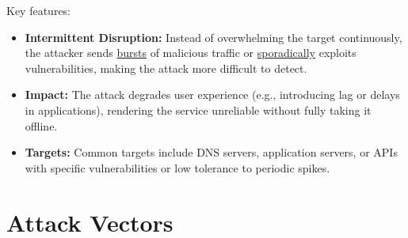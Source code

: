 Key features:
\begin{itemize}
    \item \textbf{Intermittent Disruption:} Instead of overwhelming the target continuously, the attacker sends \underline{bursts} of malicious traffic or \underline{sporadically} exploits vulnerabilities, making the attack more difficult to detect.
    \item \textbf{Impact:} The attack degrades user experience (e.g., introducing lag or delays in applications), rendering the service unreliable without fully taking it offline.
    \item \textbf{Targets:} Common targets include DNS servers, application servers, or APIs with specific vulnerabilities or low tolerance to periodic spikes.
\end{itemize}













\section{Attack Vectors}

